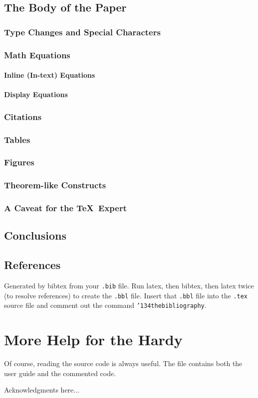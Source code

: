 \subsection{The Body of the Paper}
\subsubsection{Type Changes and  Special Characters}
\subsubsection{Math Equations}
\paragraph{Inline (In-text) Equations}
\paragraph{Display Equations}
\subsubsection{Citations}
\subsubsection{Tables}
\subsubsection{Figures}
\subsubsection{Theorem-like Constructs}
\subsubsection*{A Caveat for the \TeX\ Expert}
\subsection{Conclusions}
\subsection{References}
Generated by bibtex from your \texttt{.bib} file.  Run latex,
then bibtex, then latex twice (to resolve references)
to create the \texttt{.bbl} file.  Insert that \texttt{.bbl}
file into the \texttt{.tex} source file and comment out
the command \texttt{{\char'134}thebibliography}.
\section{More Help for the Hardy}

Of course, reading the source code is always useful.  The file
 contains both the user guide and the commented
code.

\begin{acks}
  Acknowledgments here...

\end{acks}
